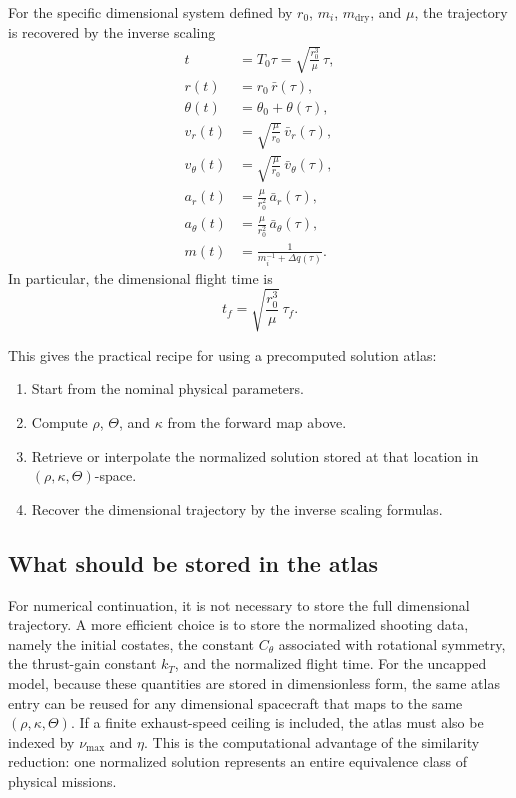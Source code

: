 \documentclass[journal,a4paper]{IEEEtran}
\begin{document}
For the specific dimensional system defined by \(r_0\), \(m_i\), \(m_\mathrm{dry}\), and \(\mu\), the trajectory is recovered by the inverse scaling
\begin{align}
  t &= T_0\tau = \sqrt{\frac{r_0^3}{\mu}}\,\tau, \\
  r(t) &= r_0\,\bar r(\tau), \\
  \theta(t) &= \theta_0 + \theta(\tau), \\
  v_r(t) &= \sqrt{\frac{\mu}{r_0}}\,\bar v_r(\tau), \\
  v_\theta(t) &= \sqrt{\frac{\mu}{r_0}}\,\bar v_\theta(\tau), \\
  a_r(t) &= \frac{\mu}{r_0^2}\,\bar a_r(\tau), \\
  a_\theta(t) &= \frac{\mu}{r_0^2}\,\bar a_\theta(\tau), \\
  m(t) &= \frac{1}{m_i^{-1}+\Delta q(\tau)}.
\end{align}
In particular, the dimensional flight time is
\begin{equation}
  t_f = \sqrt{\frac{r_0^3}{\mu}}\,\tau_f.
\end{equation}

This gives the practical recipe for using a precomputed solution atlas:
\begin{enumerate}
    \item Start from the nominal physical parameters.
    \item Compute \(\rho\), \(\Theta\), and \(\kappa\) from the forward map above.
    \item Retrieve or interpolate the normalized solution stored at that location in \((\rho,\kappa,\Theta)\)-space.
    \item Recover the dimensional trajectory by the inverse scaling formulas.
\end{enumerate}

\subsection{What should be stored in the atlas}
For numerical continuation, it is not necessary to store the full dimensional trajectory.
A more efficient choice is to store the normalized shooting data, namely the initial costates, the constant \(C_\theta\) associated with rotational symmetry, the thrust-gain constant \(k_T\), and the normalized flight time.
For the uncapped model, because these quantities are stored in dimensionless form, the same atlas entry can be reused for any dimensional spacecraft that maps to the same \((\rho,\kappa,\Theta)\). If a finite exhaust-speed ceiling is included, the atlas must also be indexed by \(\nu_{\max}\) and \(\eta\).
This is the computational advantage of the similarity reduction: one normalized solution represents an entire equivalence class of physical missions.
\end{document}
